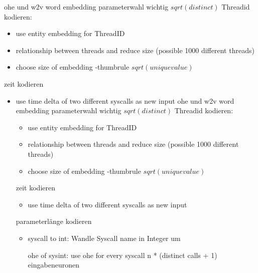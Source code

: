                 ohe und w2v
                word embedding parameterwahl wichtig $sqrt(distinct)$
                Threadid kodieren: 
                \begin{itemize}
                    \item use entity embedding for ThreadID~\cite{GUO2016} 
                    \item relationship between threads and reduce size (possible 1000 different threads)
                    \item choose size of embedding -thumbrule $sqrt(unique value)$
                \end{itemize}
                zeit kodieren
                \begin{itemize}
                    \item use time delta of two different syscalls as new input
                ohe und w2v
                word embedding parameterwahl wichtig $sqrt(distinct)$
                Threadid kodieren: 
                \begin{itemize}
                    \item use entity embedding for ThreadID~\cite{GUO2016} 
                    \item relationship between threads and reduce size (possible 1000 different threads)
                    \item choose size of embedding -thumbrule $sqrt(unique value)$
                \end{itemize}
                zeit kodieren
                \begin{itemize}
                    \item use time delta of two different syscalls as new input
                \end{itemize}
                parameterlänge kodieren
                \begin{itemize}
                    \item syscall to int: Wandle Syscall name in Integer um

                     ohe of sysint: use ohe for every syscall 
                     n * (distinct calls + 1) eingabeneuronen 


\end{itemize}
\end{itemize}
